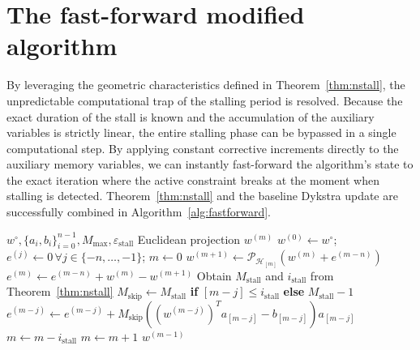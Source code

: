 \section{The fast-forward modified algorithm} \label{sec:fast_forward_algorithm}

By leveraging the geometric characteristics defined in Theorem~\ref{thm:nstall}, the unpredictable computational trap of the stalling period is resolved. Because the exact duration of the stall is known and the accumulation of the auxiliary variables is strictly linear, the entire stalling phase can be bypassed in a single computational step. By applying constant corrective increments directly to the auxiliary memory variables, we can instantly fast-forward the algorithm's state to the exact iteration where the active constraint breaks at the moment when stalling is detected. Theorem~\ref{thm:nstall} and the baseline Dykstra update are successfully combined in Algorithm~\ref{alg:fastforward}.

\algnewcommand{}
\algnewcommand{}

\begin{algorithm}
\caption{Dykstra's projection algorithm for polyhedral sets with fast-forwarding.}
\label{alg:fastforward}
\begin{algorithmic}[1]
    \Inputs $w^\circ, \{a_i, b_i\}_{i=0}^{n-1}, M_{\text{max}}, \varepsilon_{\text{stall}}$
    \Outputs Euclidean projection $w^{(m)}$
        \State $w^{(0)} \leftarrow w^\circ$; $e^{(j)} \leftarrow 0\,\forall j\in\{-n,\dots,-1\}$;  $m \leftarrow 0$ 
            \State $w^{(m+1)} \leftarrow \mathcal{P}_{\mathcal{H}_{[m]}}(w^{(m)} + e^{(m-n)})$
            \State $e^{(m)} \leftarrow e^{(m-n)} + w^{(m)} - w^{(m+1)}$
            \label{alg:start} 
                \State Obtain $M_\text{stall}$ and $i_\text{stall}$ from Theorem~\ref{thm:nstall}
                    \State $M_\text{skip}\leftarrow M_\text{stall}$ \textbf{if} $[m-j]\leq i_\text{stall}$ \textbf{else} $M_\text{stall}-1$
                    \State $e^{(m-j)} \leftarrow e^{(m-j)} + M_\text{skip}((w^{(m-j)})^T a_{[m-j]} - b_{[m-j]})a_{[m-j]}$
                \EndFor
                \State $m \leftarrow m - i_\text{stall}$\label{alg:end}
            \Else
                \State $m \leftarrow m + 1$
            \EndIf
        \EndWhile
        \State \Return $w^{(m-1)}$
\end{algorithmic}
\end{algorithm}

